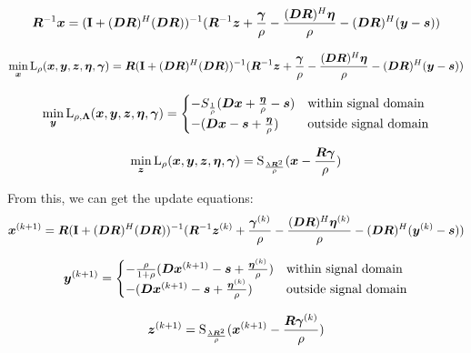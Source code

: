 \documentclass{article}
\begin{document}
\begin{equation}
\bm{R}^{-1}\bm{x} = ({\bf I} + (\bm{D}\bm{R})^H(\bm{D}\bm{R}))^{-1}(\bm{R}^{-1}\bm{z} + \frac{\bm{\gamma}}{\rho} - \frac{(\bm{D}\bm{R})^H\bm{\eta}}{\rho} - (\bm{D}\bm{R})^H(\bm{y} - \bm{s}))
\end{equation}

\begin{equation}
\min_{\bm{x}} \operatorname{L}_{\rho}(\bm{x},\bm{y},\bm{z},\bm{\eta},\bm{\gamma}) = \bm{R}({\bf I} + (\bm{D}\bm{R})^H(\bm{D}\bm{R}))^{-1}(\bm{R}^{-1}\bm{z} + \frac{\bm{\gamma}}{\rho} - \frac{(\bm{D}\bm{R})^H\bm{\eta}}{\rho} - (\bm{D}\bm{R})^H(\bm{y} - \bm{s}))
\end{equation}





\begin{equation}
\min_{\bm{y}} \operatorname{L}_{\rho,\bm{\Lambda}}(\bm{x},\bm{y},\bm{z},\bm{\eta},\bm{\gamma}) = \begin{cases}
-S_{\frac{1}{\rho}}(\bm{D}\bm{x} + \frac{\bm{\eta}}{\rho} - \bm{s}) & \text{within signal domain}\\
-(\bm{D}\bm{x} - \bm{s}  + \frac{\bm{\eta}}{\rho}) & \text{outside signal domain}
\end{cases}
\end{equation}

\begin{equation}
\min_{\bm{z}} \operatorname{L}_{\rho}(\bm{x},\bm{y},\bm{z},\bm{\eta},\bm{\gamma}) = \operatorname{S}_{\frac{\lambda\bm{R}^2}{\rho}}(\bm{x} - \frac{\bm{R}\bm{\gamma}}{\rho})
\end{equation}

From this, we can get the update equations:
\begin{equation}
\bm{x}^{(k + 1)} = \bm{R}({\bf I} + (\bm{D}\bm{R})^H(\bm{D}\bm{R}))^{-1}(\bm{R}^{-1}\bm{z}^{(k)} + \frac{\bm{\gamma}^{(k)}}{\rho} - \frac{(\bm{D}\bm{R})^H\bm{\eta}^{(k)}}{\rho} - (\bm{D}\bm{R})^H(\bm{y}^{(k)} - \bm{s}))
\end{equation}

\begin{equation}
\bm{y}^{(k + 1)}= \begin{cases}
-\frac{\rho}{1 + \rho}(\bm{D}\bm{x}^{(k + 1)} - \bm{s}  + \frac{\bm{\eta}^{(k)}}{\rho}) & \text{within signal domain}\\
-(\bm{D}\bm{x}^{(k + 1)} - \bm{s}  + \frac{\bm{\eta}^{(k)}}{\rho}) & \text{outside signal domain}
\end{cases}
\end{equation}

\begin{equation}
\bm{z}^{(k + 1)}= \operatorname{S}_{\frac{\lambda\bm{R}^2}{\rho}}(\bm{x}^{(k+1)} - \frac{\bm{R}\bm{\gamma}^{(k)}}{\rho})
\end{equation}
\end{document}
